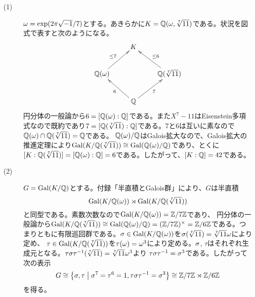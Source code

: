 \begin{sol} ${}$
\begin{description}
  \item[(1)] ${\omega} = \exp (2\pi \sqrt{-1}/7)$とする。あきらかに$K = {\mathbb Q}({\omega}, \sqrt[7]{11})$である。状況を図式で表すと次のようになる。
  \[
  \xymatrix{& K &  \\  \Q(\gro) \ar[ur]^{\leq 7} & & \Q(\sqrt[7]{11}) \ar[ul]_{\leq 6} \\  &  \Q \ar[ul]^{6} \ar[ur]_{7} &
  }
  \]
  円分体の一般論から$6= [{\mathbb Q}({\omega}):{\mathbb Q}]$である。また$X^7 - 11$はEisenstein多項式なので既約であり$7=[{\mathbb Q}(\sqrt[7]{11}):{\mathbb Q}]$である。$7$と$6$は互いに素なので${\mathbb Q}({\omega}) \cap {\mathbb Q}(\sqrt[7]{11}) = {\mathbb Q}$である。
  ${\mathbb Q}({\omega}) / {\mathbb Q}$はGalois拡大なので、Galois拡大の推進定理により$\operatorname{Gal}(K/ {\mathbb Q}(\sqrt[7]{11})) \cong \operatorname{Gal}({\mathbb Q}({\omega}) / {\mathbb Q})$であり、とくに$[K: {\mathbb Q}(\sqrt[7]{11})] = [{\mathbb Q}({\omega}):{\mathbb Q}] = 6$である。したがって、$[K:{\mathbb Q}]=42$である。
  \item[(2)] $G = \operatorname{Gal}(K/ {\mathbb Q})$とする。付録「半直積とGalois群」により、$G$は半直積
  \[
\operatorname{Gal}(K/ {\mathbb Q}({\omega})) \rtimes \operatorname{Gal}(K/ {\mathbb Q}(\sqrt[7]{11}))
  \]
  と同型である。素数次数なので$\operatorname{Gal}(K/ {\mathbb Q}({\omega})) = {\mathbb Z} / 7 {\mathbb Z}$であり、
  円分体の一般論から$\operatorname{Gal}(K/ {\mathbb Q}(\sqrt[7]{11})) \cong \operatorname{Gal}({\mathbb Q}({\omega}) / {\mathbb Q}) = ({\mathbb Z} / 7 {\mathbb Z})^{\times} = {\mathbb Z} / 6 {\mathbb Z}$である。つまりともに有限巡回群である。${\sigma} \in \operatorname{Gal}(K/ {\mathbb Q}({\omega}))$を${\sigma}(\sqrt[7]{11}) = \sqrt[7]{11} {\omega}$により定め、
  $\tau \in \operatorname{Gal}(K/ {\mathbb Q}(\sqrt[7]{11}))$を$\tau({\omega}) = {\omega}^3$により定める。${\sigma}$, $\tau$はそれぞれ生成元となる。$\tau {\sigma} \tau^{-1}(\sqrt[7]{11}) = \sqrt[7]{11} {\omega}^3$より
  $\tau {\sigma} \tau^{-1} = {\sigma}^3$である。したがって次の表示
  \[
  G \cong \left\{ {\sigma},\tau \mathrel{} \middle| \mathrel{} {\sigma}^7 = \tau^6 = 1, \tau {\sigma} \tau^{-1} = {\sigma}^3 \right\} \cong {\mathbb Z} / 7 {\mathbb Z} \rtimes {\mathbb Z} / 6 {\mathbb Z}
  \]
  を得る。


\end{description}
\end{sol}
